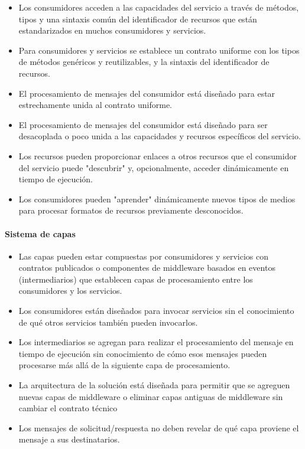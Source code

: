 	\begin{itemize}
		\item Los consumidores acceden a las capacidades del servicio a través de métodos, tipos y una sintaxis común del identificador de recursos que están estandarizados en muchos consumidores y servicios.  
		\item Para consumidores y servicios se establece un contrato uniforme con los tipos de métodos genéricos y reutilizables, y la sintaxis del identificador de recursos.
		\item El procesamiento de mensajes del consumidor está diseñado para estar estrechamente unida al contrato uniforme.	
 
		\item El procesamiento de mensajes del consumidor está diseñado para ser desacoplada o poco unida a las capacidades y recursos específicos del servicio.	
		
		\item Los recursos pueden proporcionar enlaces a otros recursos que el consumidor del servicio puede "descubrir" y, opcionalmente, acceder dinámicamente en tiempo de ejecución.
		
		\item Los consumidores pueden "aprender" dinámicamente nuevos tipos de medios para procesar formatos de recursos previamente desconocidos.			
	\end{itemize}

\paragraph{Sistema de capas}

 
	\begin{itemize}
		\item Las capas pueden estar compuestas por consumidores y servicios con contratos publicados o componentes de middleware basados en eventos (intermediarios) que establecen capas de procesamiento entre los consumidores y los servicios. 
		\item Los consumidores están diseñados para invocar servicios sin el conocimiento de qué otros servicios también pueden invocarlos.
 
			\item Los intermediarios se agregan para realizar el procesamiento del mensaje en tiempo de ejecución sin conocimiento de cómo esos mensajes pueden procesarse más allá de la siguiente capa de procesamiento.
			\item La arquitectura de la solución está diseñada para permitir que se agreguen nuevas capas de middleware o eliminar capas antiguas de middleware sin cambiar el contrato técnico
			\item Los mensajes de solicitud/respuesta no deben revelar de qué capa proviene el mensaje a sus destinatarios.			
		\end{itemize}

